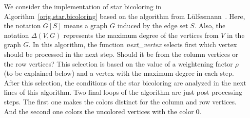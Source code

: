 \documentclass[12pt, twoside,a4paper,toc=bibliography]{scrbook}
\newcommand{\coderef}[1]{Algorithm~\protect\ref{#1}}
\begin{document}
We consider the implementation of star bicoloring in \coderef{orig.star.bicoloring} based on
the algorithm from Lülfesmann~\cite{Lulfesmann2012Fap}.
Here, the notation $G[S]$ means a graph $G$ induced by the edge set $S$.
Also, the notation $\Delta(V,G)$ represents the maximum degree of the vertices from $V$ in the graph $G$.
In this algorithm, the function \textit{next\_vertex} selects first which vertex should be processed in the next step.
Should it be from the column vertices or the row vertices?
This selection is based on the value of a weightening factor $\rho$ (to be explained below)
and a vertex with the maximum degree in each step.
After this selection, the conditions of the star bicoloring are analyzed in the next lines of this algorithm.
Two final loops of the algorithm are just post processing steps. The first one makes the colors distinct for the column and
row vertices. And the second one colors the uncolored vertices with the color $0$.
\end{document}
